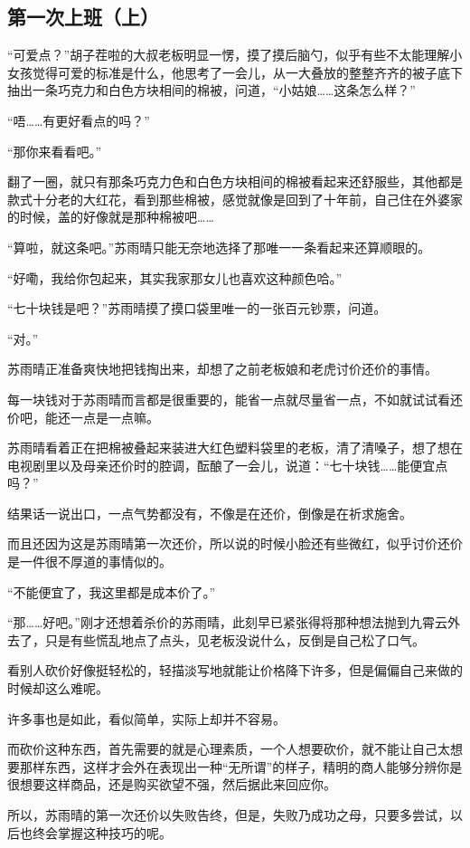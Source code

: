 \subsection{第一次上班（上）}

“可爱点？”胡子茬啦的大叔老板明显一愣，摸了摸后脑勺，似乎有些不太能理解小女孩觉得可爱的标准是什么，他思考了一会儿，从一大叠放的整整齐齐的被子底下抽出一条巧克力和白色方块相间的棉被，问道，“小姑娘……这条怎么样？”

“唔……有更好看点的吗？”

“那你来看看吧。”

翻了一圈，就只有那条巧克力色和白色方块相间的棉被看起来还舒服些，其他都是款式十分老的大红花，看到那些棉被，感觉就像是回到了十年前，自己住在外婆家的时候，盖的好像就是那种棉被吧……

“算啦，就这条吧。”苏雨晴只能无奈地选择了那唯一一条看起来还算顺眼的。

“好嘞，我给你包起来，其实我家那女儿也喜欢这种颜色哈。”

“七十块钱是吧？”苏雨晴摸了摸口袋里唯一的一张百元钞票，问道。

“对。”

苏雨晴正准备爽快地把钱掏出来，却想了之前老板娘和老虎讨价还价的事情。

每一块钱对于苏雨晴而言都是很重要的，能省一点就尽量省一点，不如就试试看还价吧，能还一点是一点嘛。

苏雨晴看着正在把棉被叠起来装进大红色塑料袋里的老板，清了清嗓子，想了想在电视剧里以及母亲还价时的腔调，酝酿了一会儿，说道：“七十块钱……能便宜点吗？”

结果话一说出口，一点气势都没有，不像是在还价，倒像是在祈求施舍。

而且还因为这是苏雨晴第一次还价，所以说的时候小脸还有些微红，似乎讨价还价是一件很不厚道的事情似的。

“不能便宜了，我这里都是成本价了。”

“那……好吧。”刚才还想着杀价的苏雨晴，此刻早已紧张得将那种想法抛到九霄云外去了，只是有些慌乱地点了点头，见老板没说什么，反倒是自己松了口气。

看别人砍价好像挺轻松的，轻描淡写地就能让价格降下许多，但是偏偏自己来做的时候却这么难呢。

许多事也是如此，看似简单，实际上却并不容易。

而砍价这种东西，首先需要的就是心理素质，一个人想要砍价，就不能让自己太想要那样东西，这样才会外在表现出一种“无所谓”的样子，精明的商人能够分辨你是很想要这样商品，还是购买欲望不强，然后据此来回应你。

所以，苏雨晴的第一次还价以失败告终，但是，失败乃成功之母，只要多尝试，以后也终会掌握这种技巧的呢。

